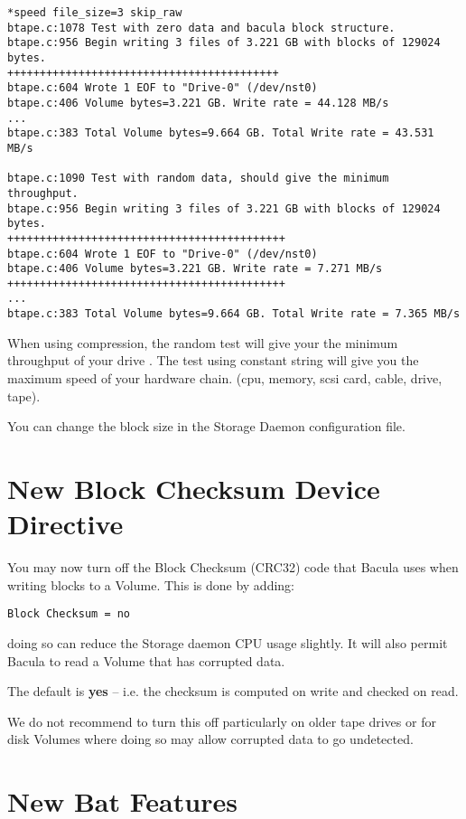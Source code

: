 \begin{verbatim}
*speed file_size=3 skip_raw
btape.c:1078 Test with zero data and bacula block structure.
btape.c:956 Begin writing 3 files of 3.221 GB with blocks of 129024 bytes.
++++++++++++++++++++++++++++++++++++++++++
btape.c:604 Wrote 1 EOF to "Drive-0" (/dev/nst0)
btape.c:406 Volume bytes=3.221 GB. Write rate = 44.128 MB/s
...
btape.c:383 Total Volume bytes=9.664 GB. Total Write rate = 43.531 MB/s

btape.c:1090 Test with random data, should give the minimum throughput.
btape.c:956 Begin writing 3 files of 3.221 GB with blocks of 129024 bytes.
+++++++++++++++++++++++++++++++++++++++++++
btape.c:604 Wrote 1 EOF to "Drive-0" (/dev/nst0)
btape.c:406 Volume bytes=3.221 GB. Write rate = 7.271 MB/s
+++++++++++++++++++++++++++++++++++++++++++
...
btape.c:383 Total Volume bytes=9.664 GB. Total Write rate = 7.365 MB/s

\end{verbatim}

When using compression, the random test will give your the minimum throughput
of your drive . The test using constant string will give you the maximum speed
of your hardware chain. (cpu, memory, scsi card, cable, drive, tape).

You can change the block size in the Storage Daemon configuration file.

\section{New {\bf Block Checksum} Device Directive}
You may now turn off the Block Checksum (CRC32) code
that Bacula uses when writing blocks to a Volume.  This is
done by adding:

\begin{verbatim}
Block Checksum = no
\end{verbatim}

doing so can reduce the Storage daemon CPU usage slightly.  It
will also permit Bacula to read a Volume that has corrupted data.

The default is {\bf yes} -- i.e. the checksum is computed on write
and checked on read. 

We do not recommend to turn this off particularly on older tape
drives or for disk Volumes where doing so may allow corrupted data
to go undetected.

\section{New Bat Features}

